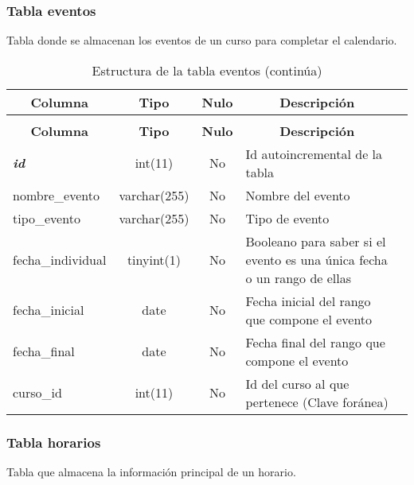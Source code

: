 \subsubsection{Tabla eventos}
Tabla donde se almacenan los eventos de un curso para completar el calendario.
%
%
 \begin{longtable}{|l|c|c|l|l|} 
 \caption{Estructura de la tabla eventos} \label{tab:eventos-structure} \\
 \hline \multicolumn{1}{|c|}{\textbf{Columna}} & \multicolumn{1}{|c|}{\textbf{Tipo}} & \multicolumn{1}{|c|}{\textbf{Nulo}} & \multicolumn{1}{|c|}{\textbf{Descripción}}\\ \hline \hline
\endfirsthead
 \caption{Estructura de la tabla eventos (continúa)} \\ 
 \hline \multicolumn{1}{|c|}{\textbf{Columna}} & \multicolumn{1}{|c|}{\textbf{Tipo}} & \multicolumn{1}{|c|}{\textbf{Nulo}} & \multicolumn{1}{|c|}{\textbf{Descripción}}\\ \hline \hline \endhead \endfoot 
\textbf{\textit{id}} & int(11) & No & Id autoincremental de la tabla \\ \hline 
nombre\_evento & varchar(255) & No & Nombre del evento\\ \hline 
tipo\_evento & varchar(255) & No & Tipo de evento \\ \hline 
fecha\_individual & tinyint(1) & No & Booleano para saber si el evento es una única fecha o un rango de ellas \\ \hline 
fecha\_inicial & date & No & Fecha inicial del rango que compone el evento \\ \hline 
fecha\_final & date & No & Fecha final del rango que compone el evento \\ \hline 
curso\_id & int(11) & No & Id del curso al que pertenece (Clave foránea) \\ \hline 
 \end{longtable}

\subsubsection{Tabla horarios}
Tabla que almacena la información principal de un horario.

